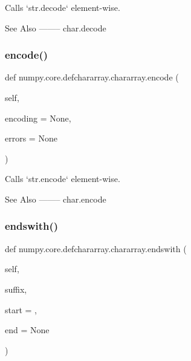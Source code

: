 \begin{DoxyVerb}Calls `str.decode` element-wise.

See Also
--------
char.decode\end{DoxyVerb}
 \mbox{\label{classnumpy_1_1core_1_1defchararray_1_1chararray_ac00909f77ebdac35c59847163094f13e}} 
\subsubsection{\texorpdfstring{encode()}{encode()}}
{\footnotesize\ttfamily def numpy.\+core.\+defchararray.\+chararray.\+encode (\begin{DoxyParamCaption}\item[{}]{self,  }\item[{}]{encoding = {\ttfamily None},  }\item[{}]{errors = {\ttfamily None} }\end{DoxyParamCaption})}

\begin{DoxyVerb}Calls `str.encode` element-wise.

See Also
--------
char.encode\end{DoxyVerb}
 \mbox{\label{classnumpy_1_1core_1_1defchararray_1_1chararray_a010b4f20b26efd9f51b3a61023f50bfe}} 
\subsubsection{\texorpdfstring{endswith()}{endswith()}}
{\footnotesize\ttfamily def numpy.\+core.\+defchararray.\+chararray.\+endswith (\begin{DoxyParamCaption}\item[{}]{self,  }\item[{}]{suffix,  }\item[{}]{start = {},  }\item[{}]{end = {\ttfamily None} }\end{DoxyParamCaption})}

